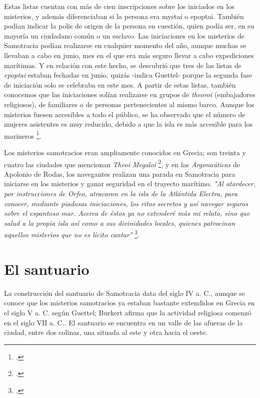 Estas listas cuentan con más de cien inscripciones sobre los iniciados en los misterios, y además diferenciaban si la persona era mystai o epoptai. También podían indicar la polis de origen de la persona en cuestión, quien podía ser, en su mayoría un ciudadano común o un esclavo. Las iniciaciones en los misterios de Samotracia podían realizarse en cualquier momento del año, aunque muchas se llevaban a cabo en junio, mes en el que era más seguro llevar a cabo expediciones marítimas. Y en relación con este hecho, se descubrió que tres de las listas de \textit{epoptai} estaban fechadas en junio, quizás -indica Guettel- porque la segunda fase de iniciación solo se celebraba en este mes.
A partir de estas listas, también conocemos que las iniciaciones solían realizarse en grupos de \textit{theoroi} (embajadores religiosos), de familiares o de personas pertenecientes al mismo barco. Aunque los misterios fuesen accesibles a todo el público, se ha observado que el número de mujeres asistentes es muy reducido, debido a que la isla es más accesible para los marineros \footcite[38-44]{guettelcoleTheoiMegaloiCult1984}.

Los misterios samotracios eran ampliamente conocidos en Grecia; son treinta y cuatro las ciudades que mencionan \textit{Theoi Megaloi} \footcite[88]{moralgarciaInfluenciaMisteriosSamotracia2020}, y en las \textit{Argonaúticas} de Apolonio de Rodas, los navegantes realizan una parada en Samotracia para iniciarse en los misterios y ganar seguridad en el trayecto marítimo.
\textit{
"Al atardecer, por instrucciones de Orfeo, atracaron en la isla de la Atlántida Electra, para conocer, mediante piadosas iniciaciones, los ritos secretos y así navegar seguros sobre el espantoso mar. Acerca de éstos ya no extenderé más mi relato, sino que salud a la propia isla así como a sus divinidades locales, quienes patrocinan aquellos misterios que no es lícito cantar"} \footcite[132]{derodasArgonauticas1996}.





\section{El santuario}

La construcción del santuario de Samotracia data del siglo IV a. C., aunque se conoce que los misterios samotracios ya estaban bastante extendidos en Grecia en el siglo V a. C. según Guettel; Burkert afirma que la actividad religiosa comenzó en el siglo VII a. C.. El santuario se encuentra en un valle de las afueras de la ciudad, entre dos colinas, una situada al este y otra hacia el oeste. 

